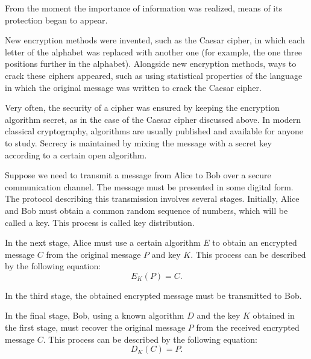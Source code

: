 From the moment the importance of information was realized, means of its protection began to appear. 

New encryption methods were invented, such as the Caesar cipher, in which each letter of the alphabet was replaced with another one (for example, the one three positions further in the alphabet). Alongside new encryption methods, ways to crack these ciphers appeared, such as using statistical properties of the language in which the original message was written to crack the Caesar cipher.

Very often, the security of a cipher was ensured by keeping the encryption algorithm secret, as in the case of the Caesar cipher discussed above. In modern classical cryptography, algorithms are usually published and available for anyone to study. Secrecy is maintained by mixing the message with a secret key according to a certain open algorithm.

Suppose we need to transmit a message from Alice to Bob over a secure communication channel. The message must be presented in some digital form. The protocol describing this transmission involves several stages. Initially, Alice and Bob must obtain a common random sequence of numbers, which will be called a key. This process is called key distribution.

In the next stage, Alice must use a certain algorithm $E$ to obtain an encrypted message $C$ from the original message $P$ and key $K$. This process can be described by the following equation:
\begin{equation}
E_{K}\left(P\right) = C.
\label{eqPart3CryptoEncryptClass}
\end{equation}

In the third stage, the obtained encrypted message must be transmitted to Bob.

In the final stage, Bob, using a known algorithm $D$ and the key $K$ obtained in the first stage, must recover the original message $P$ from the received encrypted message $C$. This process can be described by the following equation:
\begin{equation}
D_{K}\left(C\right) = P.
\label{eqPart3CryptoDeEncryptClass}
\end{equation}

